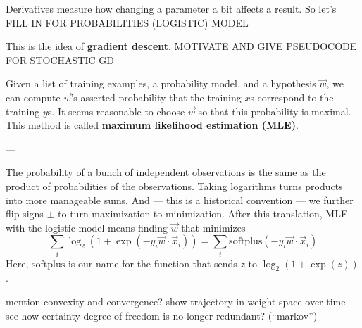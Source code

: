 \documentclass[11pt, justified]{tufte-book}
\newcommand{\attnsam}[1]{{\red \textsf{#1}}}
\newcommand{\sampassage}[1]{
   \vspace{0.1cm}
   \par\noindent{\hspace{-2cm}\normalsize \sc \gre #1} ---
}
\theoremstyle{definition}
\begin{document}
        Derivatives measure how changing a parameter a bit affects a result. 
        So let's 
        \attnsam{FILL IN FOR PROBABILITIES (LOGISTIC) MODEL} 

        This is the idea of \textbf{gradient descent}.
        \attnsam{MOTIVATE AND GIVE PSEUDOCODE FOR STOCHASTIC GD} 

        Given a list of training examples, a probability model, and a
        hypothesis $\vec w$, we can compute $\vec w$'s asserted probability
        that the training $x$s correspond to the training $y$s.  It seems
        reasonable to choose $\vec w$ so that this probability is maximal.
        This method is called \textbf{maximum likelihood estimation (MLE)}.


      \sampassage{logistic models} %

        The probability of a bunch of independent observations is the same as
        the product of probabilities of the observations.  Taking logarithms
        turns products into more manageable sums.  And --- this is a historical
        convention --- we further flip signs $\pm$ to turn maximization to 
        minimization.
        After this translation, MLE with the logistic model means finding $\vec
        w$ that minimizes
        $$
          \sum_i \log_2(1+\exp(-y_i\vec w\cdot \vec x_i))
          =
          \sum_i \text{softplus}(-y_i\vec w\cdot \vec x_i) 
        $$
        Here, $\text{softplus}$ is our name for the function that sends
        $z$ to $\log_2(1+\exp(z))$.

        \attnsam{mention convexity and convergence?}
        \attnsam{show trajectory in weight space over time -- see how certainty
        degree of freedom is no longer redundant? (``markov'')}

\end{document}
